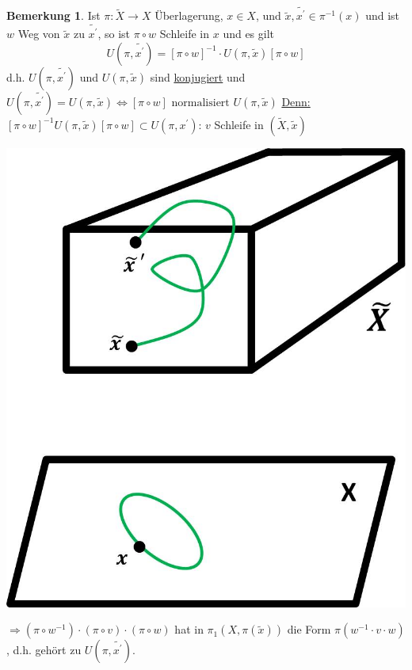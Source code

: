 \documentclass[a4paper,11pt,notitlepage]{report}
\theoremstyle{definition}
\newtheorem{remark}{Bemerkung}[chapter]
\begin{document}
\begin{remark}
	Ist $\pi \colon \widetilde{X} \rightarrow X$ Überlagerung, $x \in X$, und $\widetilde{x}, \widetilde{x^\prime} \in \pi^{-1}(x)$ und ist $w$ Weg von $\widetilde{x}$ zu $\widetilde{x^\prime}$, so ist $\pi \circ w$ Schleife in $x$ und es gilt
	$$U(\pi, \widetilde{x^\prime}) = [\pi \circ w]^{-1} \cdot U(\pi, \widetilde{x})[\pi \circ w]$$
	d.h. $U(\pi, \widetilde{x^\prime})$ und $U(\pi, \widetilde{x})$ sind \underline{konjugiert} und \newline $U(\pi, \widetilde{x^\prime}) = U(\pi, \widetilde{x}) \Leftrightarrow [\pi \circ w] \text{ normalisiert } U(\pi, \widetilde{x})$
	\newline
	\underline{Denn:} $[\pi \circ w]^{-1} U(\pi, \widetilde{x}) [\pi \circ w] \subset U(\pi, x^\prime)$: $v$ Schleife in $(\widetilde{X}, \widetilde{x})$
	\begin{center}
	\includegraphics[scale=0.3]{images/Normalisation.jpg}
	\end{center}
	$\Rightarrow (\pi \circ w^{-1}) \cdot (\pi \circ v) \cdot (\pi \circ w)$ hat in $\pi_1(X, \pi(\widetilde{x}))$ die Form $\pi(w^{-1} \cdot v \cdot w)$, d.h. gehört zu $U(\pi, \widetilde{x^\prime})$.
\end{remark}
\end{document}
